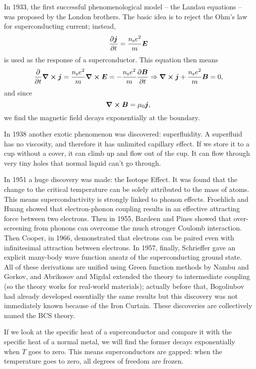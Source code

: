 \documentclass[hyperref, a4paper]{article}
\begin{document}
In 1933, the first successful phenomenological model -- 
the Landau equations -- was proposed by the London brothers.
The basic idea is to reject the Ohm's law for superconducting current;
instead, 
\begin{equation}
    \pdv{\vb*{j}}{t} = \frac{n_\text{s} e^2}{m} \vb*{E}
\end{equation}
is used as the response of a superconductor.
This equation then means 
\begin{equation}
    \pdv{t} \curl{\vb*{j}} = \frac{n_\text{s} e^2}{m} \curl{\vb*{E}}
    = - \frac{n_\text{s} e^2}{m} \pdv{\vb*{B}}{t}
    \Rightarrow \curl{\vb*{j}} + \frac{n_\text{s} e^2}{m} \vb*{B} = 0,
\end{equation}
and since 
\begin{equation}
    \curl{\vb*{B}} = \mu_0 \vb*{j},
\end{equation}
we find the magnetic field decays exponentially at the boundary. 

In 1938 another exotic phenomenon was discovered: superfluidity.
A superfluid has no viscosity, 
and therefore it has unlimited capillary effect.
If we store it to a cup without a cover, 
it can climb up and flow out of the cup.
It can flow through very tiny holes that 
normal liquid can't go through.

In 1951 a huge discovery was made: the Isotope Effect.
It was found that the change to the critical temperature 
can be solely attributed to the mass of atoms.
This means superconductivity is strongly linked to phonon effects.
Froehlich and Huang showed that 
electron-phonon coupling results in an effective attracting force between two electrons.
Then in 1955, Bardeen and Pines showed that 
over-screening from phonons can overcome the much stronger Coulomb interaction.
Then Cooper, in 1966, demonstrated 
that electrons can be paired even with infinitesimal attraction between electrons.
In 1957, finally, Schrieffer gave an explicit many-body wave function ansatz 
of the superconducting ground state.
All of these derivations are unified using Green function methods by Nambu and Gorkov, 
and Abrikosov and Migdal extended the theory to intermediate coupling
(so the theory works for real-world materials);
actually before that, Bogoliubov had already developed 
essentially the same results but this discovery was not immediately known 
because of the Iron Curtain.
These discoveries are collectively named the BCS theory.

If we look at the specific heat of a superconductor 
and compare it with the specific heat of a normal metal, 
we will find the former decays exponentially when $T$ goes to zero.
This means superconductors are gapped: 
when the temperature goes to zero, 
all degrees of freedom are frozen.
\end{document}
